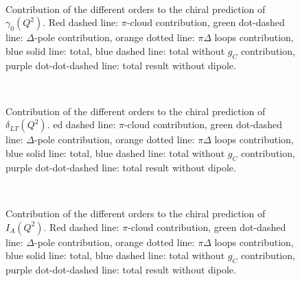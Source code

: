 \documentclass[prc,twocolumn,showpacs,preprintnumbers,amsmath,amssymb
,superscriptaddress,a4paper,nofootinbib
]{revtex4-1}
\begin{document}
\begin{figure}[H]
\begin{center}
\hspace{-0.3cm}\\ \hspace{-0.3cm} 
\caption{Contribution of the different orders to the chiral prediction of $\gamma_0(Q^2)$. Red dashed line: $\pi$-cloud contribution, green dot-dashed line: $\Delta$-pole contribution, orange dotted line: $\pi \Delta$ loops contribution, blue solid line: total, blue dashed line: total without $g_C$ contribution, purple dot-dot-dashed line: total result without dipole. \label{Fig:gamma0-orders}}
\end{center}
\end{figure}
 

\begin{figure}[H]
\begin{center}
\hspace{-0.3cm}\\ \hspace{-0.3cm} 
\caption{Contribution of the different orders to the chiral prediction of $\delta_{LT}(Q^2)$. ed dashed line: $\pi$-cloud contribution, green dot-dashed line: $\Delta$-pole contribution, orange dotted line: $\pi \Delta$ loops contribution, blue solid line: total, blue dashed line: total without $g_C$ contribution, purple dot-dot-dashed line: total result without dipole.  \label{Fig:deltaLT-orders}}
\end{center}
\end{figure}

\begin{figure}[t]
\begin{center}
\hspace{-0.3cm}\\ \hspace{-0.3cm} 
\caption{Contribution of the different orders to the chiral prediction of $I_A(Q^2)$. Red dashed line: $\pi$-cloud contribution, green dot-dashed line: $\Delta$-pole contribution, orange dotted line: $\pi \Delta$ loops contribution, blue solid line: total, blue dashed line: total without $g_C$ contribution, purple dot-dot-dashed line: total result without dipole. \label{Fig:IA-orders-plot}}
\end{center}
\end{figure}
\end{document}
